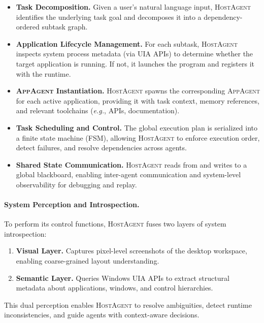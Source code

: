 \documentclass[sigplan,10pt]{acmart}
\newcommand{\hosta}{\textsc{HostAgent}\xspace}
\newcommand{\appa}{\textsc{AppAgent}\xspace}
\newcommand{\eg}{\textit{e.g.},\xspace}
\begin{document}
\begin{itemize}
    \item \textbf{Task Decomposition.} Given a user's natural language input, \hosta identifies the underlying task goal and decomposes it into a dependency-ordered subtask graph.
    
    \item \textbf{Application Lifecycle Management.} For each subtask, \hosta inspects system process metadata (via UIA APIs) to determine whether the target application is running. If not, it launches the program and registers it with the runtime.

    \item \textbf{\appa Instantiation.} \hosta spawns the corresponding \appa for each active application, providing it with task context, memory references, and relevant toolchains (\eg APIs, documentation).

    \item \textbf{Task Scheduling and Control.} The global execution plan is serialized into a finite state machine (FSM), allowing \hosta to enforce execution order, detect failures, and resolve dependencies across agents.

    \item \textbf{Shared State Communication.} \hosta reads from and writes to a global blackboard, enabling inter-agent communication and system-level observability for debugging and replay.
\end{itemize}

\paragraph{System Perception and Introspection.}
To perform its control functions, \hosta fuses two layers of system introspection:
\begin{enumerate}
    \item \textbf{Visual Layer.} Captures pixel-level screenshots of the desktop workspace, enabling coarse-grained layout understanding.
    \item \textbf{Semantic Layer.} Queries Windows UIA APIs to extract structural metadata about applications, windows, and control hierarchies.
\end{enumerate}
This dual perception enables \hosta to resolve ambiguities, detect runtime inconsistencies, and guide agents with context-aware decisions.
\end{document}
